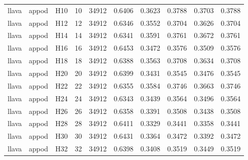\begin{table}[tbp]
\begin{tabular}{lllrrrrrrr}
llava & appod & H10 & 10 & 34912 & 0.6406 & 0.3623 & 0.3788 & 0.3703 & 0.3788 \\
llava & appod & H12 & 12 & 34912 & 0.6346 & 0.3552 & 0.3704 & 0.3626 & 0.3704 \\
llava & appod & H14 & 14 & 34912 & 0.6341 & 0.3591 & 0.3761 & 0.3672 & 0.3761 \\
llava & appod & H16 & 16 & 34912 & 0.6453 & 0.3472 & 0.3576 & 0.3509 & 0.3576 \\
llava & appod & H18 & 18 & 34912 & 0.6388 & 0.3563 & 0.3708 & 0.3634 & 0.3708 \\
llava & appod & H20 & 20 & 34912 & 0.6399 & 0.3431 & 0.3545 & 0.3476 & 0.3545 \\
llava & appod & H22 & 22 & 34912 & 0.6355 & 0.3584 & 0.3746 & 0.3663 & 0.3746 \\
llava & appod & H24 & 24 & 34912 & 0.6343 & 0.3439 & 0.3564 & 0.3496 & 0.3564 \\
llava & appod & H26 & 26 & 34912 & 0.6358 & 0.3391 & 0.3508 & 0.3438 & 0.3508 \\
llava & appod & H28 & 28 & 34912 & 0.6411 & 0.3329 & 0.3441 & 0.3358 & 0.3441 \\
llava & appod & H30 & 30 & 34912 & 0.6431 & 0.3364 & 0.3472 & 0.3392 & 0.3472 \\
llava & appod & H32 & 32 & 34912 & 0.6398 & 0.3408 & 0.3519 & 0.3449 & 0.3519 \\
\bottomrule
\end{tabular}
\end{table}
